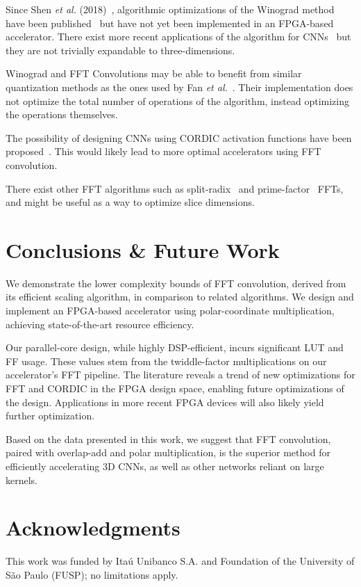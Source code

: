 \documentclass[
  10pt,
  \FORMAT-MODE,
  \REVIEW-MODE,
  \TWOSIDE-MODE
]{IEEEtran}
\begin{document}
  Since Shen \textit{et al.} (2018)~\cite{shen2018towards}, algorithmic optimizations of the Winograd method have been published~\cite{barabasz2019winograd,barabasz2020error,alam2022winograd} but have not yet been implemented in an FPGA-based accelerator. There exist more recent applications of the algorithm for CNNs~\cite{kala2019high,jiang2025fpga} but they are not trivially expandable to three-dimensions.

  Winograd and FFT Convolutions may be able to benefit from similar quantization methods as the ones used by Fan \textit{et al.}~\cite{fan2021high}. Their implementation does not optimize the total number of operations of the algorithm, instead optimizing the operations themselves.
  
  The possibility of designing CNNs using CORDIC activation functions have been proposed~\cite{shen2024efficient, kokane2025retrospective}. This would likely lead to more optimal accelerators using FFT convolution.

  There exist other FFT algorithms such as split-radix~\cite{sorensen2003computing} and prime-factor~\cite{burrus1981place} FFTs, and might be useful as a way to optimize slice dimensions.

\section{Conclusions \& Future Work}\label{sec:conc}
  We demonstrate the lower complexity bounds of FFT convolution, derived from its efficient scaling algorithm, in comparison to related algorithms. We design and implement an FPGA-based accelerator using polar-coordinate multiplication, achieving state-of-the-art resource efficiency.

  Our parallel-core design, while highly DSP-efficient, incurs significant LUT and FF usage. These values stem from the twiddle-factor multiplications on our accelerator's FFT pipeline. The literature reveals a trend of new optimizations for FFT and CORDIC in the FPGA design space, enabling future optimizations of the design. Applications in more recent FPGA devices will also likely yield further optimization.
  
  Based on the data presented in this work, we suggest that FFT convolution, paired with overlap-add and polar multiplication, is the superior method for efficiently accelerating 3D CNNs, as well as other networks reliant on large kernels.

\ifCLASSOPTIONjournal
  \section*{Acknowledgments} %
    This work was funded by Itaú Unibanco S.A. and Foundation of the University of São Paulo (FUSP); no limitations apply.
\fi




\end{document}
